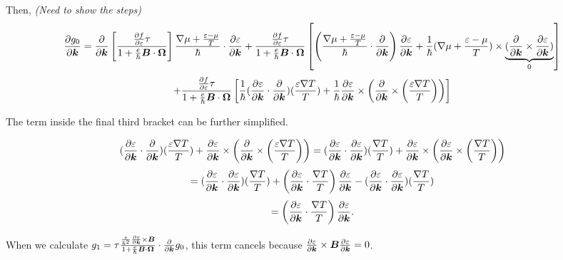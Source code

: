 \documentclass{report}
\renewcommand\vec[1]{\ensuremath\boldsymbol{#1}} %
\begin{document}
Then, \textit{(Need to show the steps)}
$$\frac{\partial g_0}{\partial \vec{k}} = 
\frac{\partial}{\partial \vec{k}} \left[ \frac{\frac{\partial f} {\partial \varepsilon} \tau}{1 + \frac{e}{\hbar} \vec{B}\cdot\vec{\Omega}}
\right] \frac{\nabla \mu + \frac{\varepsilon - \mu}{T}}{\hbar} \cdot \frac{\partial \varepsilon}{\partial \vec{k}} + \frac{\frac{\partial f} {\partial \varepsilon} \tau}{1 + \frac{e}{\hbar} \vec{B}\cdot\vec{\Omega}} \left[\left(\frac{\nabla \mu + \frac{\varepsilon - \mu}{T}}{\hbar} \cdot \frac{\partial }{\partial \vec{k}} \right)\frac{\partial \varepsilon}{\partial \vec{k}} + \frac{1}{\hbar} (\nabla \mu + \frac{\varepsilon - \mu}{T})\times \underbrace{(\frac{\partial }{\partial \vec{k}} \times \frac{\partial \varepsilon}{\partial \vec{k}})}_0 \right]
$$
$$+ \frac{\frac{\partial f} {\partial \varepsilon} \tau}{1 + \frac{e}{\hbar} \vec{B}\cdot\vec{\Omega}} \left[\frac{1}{\hbar} (\frac{\partial \varepsilon}{\partial \vec{k}} \cdot \frac{\partial }{\partial \vec{k}}) (\frac{\varepsilon \nabla T}{T}) + \frac{1}{\hbar} \frac{\partial \varepsilon}{\partial \vec{k}} \times \left(  \frac{\partial }{\partial \vec{k}} \times \left(\frac{\varepsilon \nabla T}{T}\right) \right) \right]$$

The term inside the final third bracket can be further simplified.

$$ (\frac{\partial \varepsilon}{\partial \vec{k}} \cdot \frac{\partial }{\partial \vec{k}}) (\frac{\varepsilon \nabla T}{T}) + \frac{\partial \varepsilon}{\partial \vec{k}} \times \left(  \frac{\partial }{\partial \vec{k}} \times \left(\frac{\varepsilon \nabla T}{T}\right) \right) = (\frac{\partial \varepsilon}{\partial \vec{k}} \cdot \frac{\partial \varepsilon}{\partial \vec{k}}) (\frac{ \nabla T}{T}) + \frac{\partial \varepsilon}{\partial \vec{k}} \times \left(  \frac{\partial \varepsilon}{\partial \vec{k}} \times \left(\frac{\nabla T}{T}\right) \right)$$
$$  =(\frac{\partial \varepsilon}{\partial \vec{k}} \cdot \frac{\partial \varepsilon}{\partial \vec{k}}) (\frac{ \nabla T}{T}) + \left(  \frac{\partial \varepsilon}{\partial \vec{k}} \cdot \frac{\nabla T}{T}\right) \frac{\partial \varepsilon}{\partial \vec{k}} -  (\frac{\partial \varepsilon}{\partial \vec{k}} \cdot \frac{\partial \varepsilon}{\partial \vec{k}}) (\frac{ \nabla T}{T})$$
$$= \left(  \frac{\partial \varepsilon}{\partial \vec{k}} \cdot \frac{\nabla T}{T}\right) \frac{\partial \varepsilon}{\partial \vec{k}}.$$

When we calculate $g_1 = \tau \frac{\frac{e}{\hbar^2} \frac{\partial \varepsilon}{\partial \vec{k}} \times \vec{B}}{1 + \frac{e}{\hbar} \vec{B}\cdot\vec{\Omega}} \cdot\frac{\partial}{\partial \vec{k}} g_0$, this term cancels because $\frac{\partial \varepsilon}{\partial \vec{k}} \times \vec{B}  \frac{\partial \varepsilon}{\partial \vec{k}} = 0$.
\end{document}
